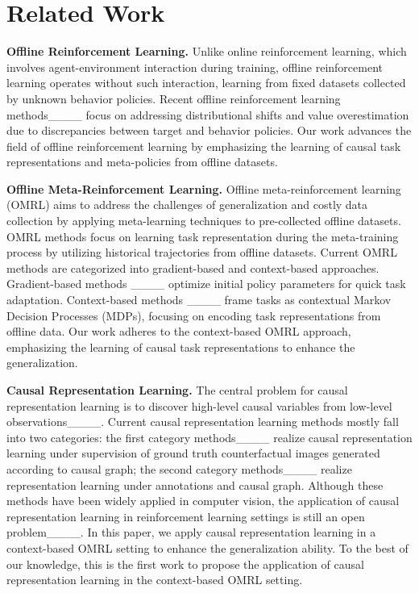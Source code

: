 \section{Related Work}
\noindent\textbf{Offline Reinforcement Learning.} Unlike online reinforcement learning, which involves agent-environment interaction during training, offline reinforcement learning operates without such interaction, learning from fixed datasets collected by unknown behavior policies. Recent offline reinforcement learning methods____ focus on addressing distributional shifts and value overestimation due to discrepancies between target and behavior policies. Our work advances the field of offline reinforcement learning by emphasizing the learning of causal task representations and meta-policies from offline datasets.


\noindent\textbf{Offline Meta-Reinforcement Learning.} Offline meta-reinforcement learning (OMRL) aims to address the challenges of generalization and costly data collection by applying meta-learning techniques to pre-collected offline datasets. OMRL methods focus on learning task representation during the meta-training process by utilizing historical trajectories from offline datasets. 
Current OMRL methods are categorized into gradient-based and context-based approaches. Gradient-based methods ____ optimize initial policy parameters for quick task adaptation. Context-based methods ____ frame tasks as contextual Markov Decision Processes (MDPs), focusing on encoding task representations from offline data.
Our work adheres to the context-based OMRL approach, emphasizing the learning of causal task representations to enhance the generalization.


\noindent\textbf{Causal Representation Learning.} 
The central problem for causal representation learning is to discover high-level causal variables from low-level observations____. Current causal representation learning methods mostly fall into two categories: the first category methods____ realize causal representation learning under supervision of ground truth counterfactual images generated according to causal graph; the second category methods____ realize representation learning under annotations and causal graph. Although these methods have been widely applied in computer vision, the application of causal representation learning in reinforcement learning settings is still an open problem____. In this paper, we apply causal representation learning in a context-based OMRL setting to enhance the generalization ability. To the best of our knowledge, this is the first work to propose the application of causal representation learning in the context-based OMRL setting.


